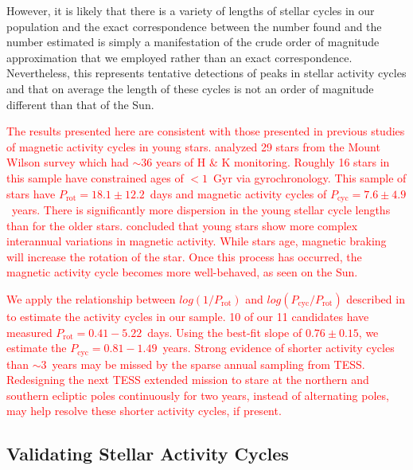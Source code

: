 \documentclass[twocolumn, linenumbers]{aastex631}
\begin{document}
However, it is likely that there is a variety of lengths of stellar cycles in our
population and the exact correspondence between the number found and the number
estimated is simply a manifestation of the crude order of magnitude approximation
that we employed rather than an exact correspondence. Nevertheless, this represents
tentative detections of peaks in stellar activity cycles and that on average the
length of these cycles is not an order of magnitude different than that of the Sun.

\textcolor{red}{The results presented here are consistent with those presented in
previous studies of magnetic activity cycles in young stars. \cite{olah16} analyzed
29 stars from the Mount Wilson survey which had $\sim 36$ years of 
H \& K monitoring. Roughly 16 stars in this sample have constrained ages of $< 1$~Gyr
via gyrochronology. This sample of stars have $P_\textrm{rot} = 18.1 \pm 12.2$~days
and magnetic activity cycles of $P_\textrm{cyc} = 7.6 \pm 4.9$~years. There is
significantly more dispersion in the young stellar cycle lengths than for the older
stars. \cite{olah16} concluded that young stars show more complex interannual variations
in magnetic activity. While stars age, magnetic braking will increase the rotation
of the star. Once this process has occurred, the magnetic activity cycle becomes more
well-behaved, as seen on the Sun.}

\textcolor{red}{We apply the relationship between $log(1/P_\textrm{rot})$ and
$log(P_\textrm{cyc}/P_\textrm{rot})$ described in \cite{olah16} to estimate the
activity cycles in our sample. 10 of our 11 candidates have measured
$P_\textrm{rot} = 0.41 - 5.22$~days. Using the best-fit slope of $0.76 \pm 0.15$,
we estimate the $P_\textrm{cyc} = 0.81 - 1.49$~years. Strong evidence of shorter
activity cycles than $\sim 3$~years may be missed by the sparse annual sampling
from TESS. Redesigning the next TESS extended mission to stare at the northern and
southern ecliptic poles continuously for two years, instead of alternating poles,
may help resolve these shorter activity cycles, if present.}


\subsection{Validating Stellar Activity Cycles}
\end{document}
